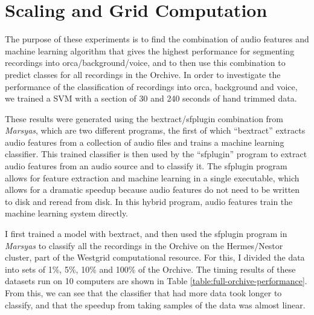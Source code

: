 \documentclass[12pt,oneside]{book}
\begin{document}
\section{Scaling and Grid Computation}


The purpose of these experiments is to find the combination of audio
features and machine learning algorithm that gives the highest
performance for segmenting recordings into orca/background/voice, and
to then use this combination to predict classes for all recordings in
the Orchive.  In order to investigate the performance of the
classification of recordings into orca, background and voice, we
trained a SVM with a section of 30 and 240 seconds of hand trimmed
data.

These results were generated using the bextract/sfplugin combination
from \textit{Marsyas}, which are two different programs, the first of which
``bextract'' extracts audio features from a collection of audio files
and trains a machine learning classifier.  This trained classifier is
then used by the ``sfplugin'' program to extract audio features from
an audio source and to classify it.  The sfplugin program allows for
feature extraction and machine learning in a single executable, which
allows for a dramatic speedup because audio features do not need to be
written to disk and reread from disk.  In this hybrid program, audio
features train the machine learning system directly.

I first trained a model with bextract, and then used the sfplugin
program in \textit{Marsyas} to classify all the recordings in the Orchive on
the Hermes/Nestor cluster, part of the Westgrid computational
resource.  For this, I divided the data into sets of 1\%, 5\%, 10\%
and 100\% of the Orchive.  The timing results of these datasets run on
10 computers are shown in Table \ref{table:full-orchive-performance}.
From this, we can see that the classifier that had more data took
longer to classify, and that the speedup from taking samples of the
data was almost linear.
\end{document}
